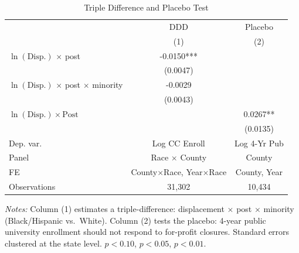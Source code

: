 \begin{table}[htbp]
\centering
\caption{Triple Difference and Placebo Test}
\label{tab:ddd}
\begin{threeparttable}
\begin{tabular}{l cc}
\toprule
 & DDD & Placebo \\
 & (1) & (2) \\
\midrule
$\ln(\text{Disp.})$ $\times$ post & -0.0150*** & \\
 & (0.0047) & \\
$\ln(\text{Disp.})$ $\times$ post $\times$ minority & -0.0029 & \\
 & (0.0043) & \\
\midrule
$\ln(\text{Disp.}) \times \text{Post}$ & & 0.0267** \\
 & & (0.0135) \\
\midrule
Dep. var. & Log CC Enroll & Log 4-Yr Pub \\
Panel & Race $\times$ County & County \\
FE & County$\times$Race, Year$\times$Race & County, Year \\
Observations & 31,302 & 10,434 \\
\bottomrule
\end{tabular}
\begin{tablenotes}[flushleft]
\small
\item \textit{Notes:} Column (1) estimates a triple-difference: displacement $\times$ post $\times$ minority (Black/Hispanic vs.~White). Column (2) tests the placebo: 4-year public university enrollment should not respond to for-profit closures. Standard errors clustered at the state level. \sym{*} $p<0.10$, \sym{**} $p<0.05$, \sym{***} $p<0.01$.
\end{tablenotes}
\end{threeparttable}
\end{table}

